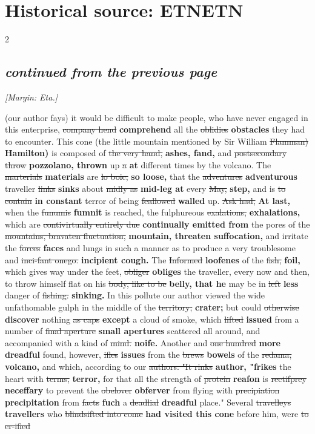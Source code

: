 \documentclass[10pt]{article}
\begin{document}
\section*{Historical source: ETNETN}
\begin{multicols}{2}
\subsection*{\textit{continued from the previous page}}
{\small\itshape [Margin: Eta.]}\par
(our author fays) it would be difficult to make people, who have never engaged in this enterprise, \sout{company hend} \textbf{comprehend} all the \sout{oblidies} \textbf{obstacles} they had to encounter. This cone (the little mountain mentioned by Sir William \sout{Flamman)} \textbf{Hamilton)} is composed of \sout{the very hand,} \textbf{ashes, fand,} and \sout{postsecondary throw} \textbf{pozzolano, thrown} up \sout{a} \textbf{at} different times by the volcano. The \sout{marterials} \textbf{materials} are \sout{lo boic,} \textbf{so loose,} that the \sout{adventures} \textbf{adventurous} traveller \sout{links} \textbf{sinks} about \sout{midly as} \textbf{mid-leg at} every \sout{May,} \textbf{step,} and is \sout{to contain} \textbf{in constant} terror of being \sout{feallowed} \textbf{walled} up. \sout{Ask had,} \textbf{At last,} when the \sout{funumis} \textbf{fumnit} is reached, the fulphureous \sout{exalations,} \textbf{exhalations,} which are \sout{contivirtually entirely due} \textbf{continually emitted from} the pores of the \sout{mountains, bravaten fluctuation,} \textbf{mountain, threaten suffocation,} and irritate the \sout{forces} \textbf{faces} and lungs in such a manner as to produce a very troublesome and \sout{inci-fant onego.} \textbf{incipient cough.} The \sout{Informed} \textbf{loofenes} of the \sout{fish,} \textbf{foil,} which gives way under the feet, \sout{obliger} \textbf{obliges} the traveller, every now and then, to throw himself flat on his \sout{body, like to be} \textbf{belly, that he} may be in \sout{left} \textbf{less} danger of \sout{fishing.} \textbf{sinking.} In this pollute our author viewed the wide unfathomable gulph in the middle of the \sout{territory;} \textbf{crater;} but could \sout{otherwise} \textbf{discover} nothing \sout{as caps} \textbf{except} a cloud of smoke, which \sout{lifted} \textbf{issued} from a number of \sout{final aperture} \textbf{small apertures} scattered all around, and accompanied with a kind of \sout{mind.} \textbf{noife.} Another and \sout{one hundred} \textbf{more dreadful} found, however, \sout{ifles} \textbf{issues} from the \sout{brews} \textbf{bowels} of the \sout{redama,} \textbf{volcano,} and which, according to our \sout{authors. "It rinks} \textbf{author, "frikes} the heart with \sout{terms,} \textbf{terror,} for that all the strength of \sout{protein} \textbf{reafon} is \sout{rectifprey} \textbf{neceffary} to prevent the \sout{obelover} \textbf{obferver} from flying with \sout{precipiation} \textbf{precipitation} from \sout{facts} \textbf{fuch} a \sout{deadlial} \textbf{dreadful} place." Several \sout{travelleys} \textbf{travellers} who \sout{blindsifted into come} \textbf{had visited this cone} before him, were \sout{to er-ified} 
\end{multicols}
\end{document}
